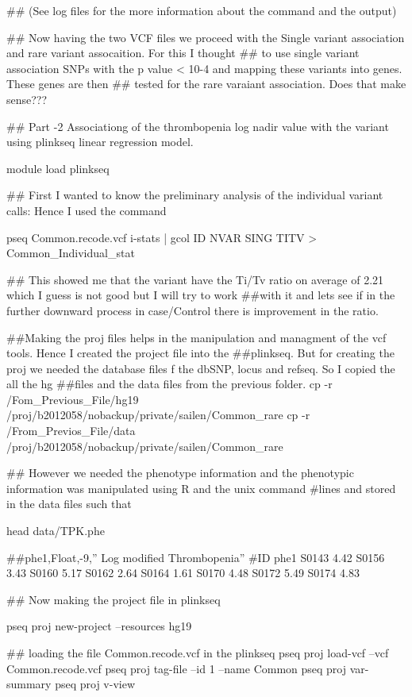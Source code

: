 ## (See log files for the more information about the command and the output)

## Now having the two VCF files we proceed with the Single variant association and rare variant assocaition. For this I thought ## to use single variant association SNPs with the p value < 10-4 and mapping these variants into genes. These genes are then ## tested for the rare varaiant association. Does that make sense???

## Part -2 Associationg of the thrombopenia log nadir value with the variant using plinkseq linear regression model.
 
 module load plinkseq
 
 ## First I wanted to know the preliminary analysis of the individual variant calls: Hence I used the command
 
 pseq Common.recode.vcf i-stats | gcol ID NVAR SING TITV > Common_Individual_stat
 
 ## This showed me that the variant have the Ti/Tv ratio on average of 2.21 which I guess is not good but I will try to work ##with it and lets see if in the further downward process in case/Control there is improvement in the ratio.

##Making the proj files helps in the manipulation and managment of the vcf tools. Hence I created the project file into the ##plinkseq. But for creating the proj we needed the database files f the dbSNP, locus and refseq. So I copied the all the hg ##files and the data files from the previous folder.
 cp -r /Fom_Previous_File/hg19 /proj/b2012058/nobackup/private/sailen/Common_rare
 cp -r /From_Previos_File/data /proj/b2012058/nobackup/private/sailen/Common_rare
 
## However we needed the phenotype information and the phenotypic information was manipulated using R and the unix command  #lines  and stored in the data files such that
 
head data/TPK.phe 
 
##phe1,Float,-9,” Log modified Thrombopenia”
#ID	phe1
S0143	4.42
S0156	3.43
S0160	5.17
S0162	2.64
S0164	1.61
S0170	4.48
S0172	5.49
S0174	4.83
 
## Now making the project file in plinkseq

pseq proj new-project --resources hg19

## loading the file Common.recode.vcf in the plinkseq
pseq proj load-vcf --vcf Common.recode.vcf 
pseq proj tag-file --id 1 --name Common
pseq proj var-summary
pseq proj v-view

